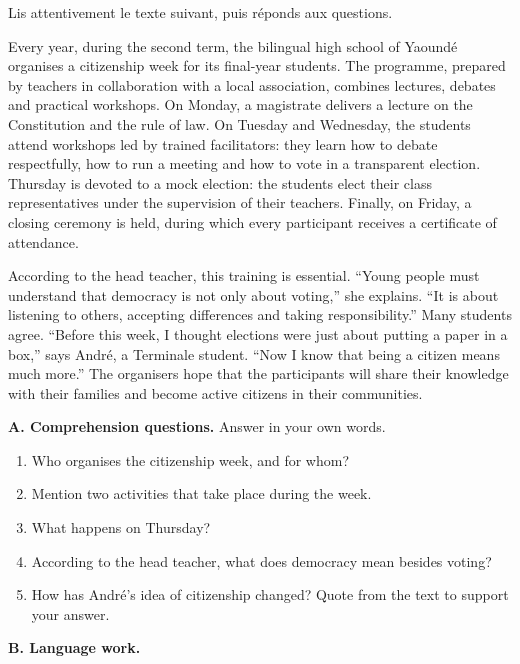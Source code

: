 \documentclass[11pt]{article}
\begin{document}
\begin{exercice}
Lis attentivement le texte suivant, puis réponds aux questions.

\begin{textebox}
Every year, during the second term, the bilingual high school of Yaoundé organises a citizenship week for its final-year students. The programme, prepared by teachers in collaboration with a local association, combines lectures, debates and practical workshops. On Monday, a magistrate delivers a lecture on the Constitution and the rule of law. On Tuesday and Wednesday, the students attend workshops led by trained facilitators: they learn how to debate respectfully, how to run a meeting and how to vote in a transparent election. Thursday is devoted to a mock election: the students elect their class representatives under the supervision of their teachers. Finally, on Friday, a closing ceremony is held, during which every participant receives a certificate of attendance.

According to the head teacher, this training is essential. “Young people must understand that democracy is not only about voting,” she explains. “It is about listening to others, accepting differences and taking responsibility.” Many students agree. “Before this week, I thought elections were just about putting a paper in a box,” says André, a Terminale student. “Now I know that being a citizen means much more.” The organisers hope that the participants will share their knowledge with their families and become active citizens in their communities.
\end{textebox}

\textbf{A. Comprehension questions.} Answer in your own words.

\begin{enumerate}
\item Who organises the citizenship week, and for whom?
\item Mention two activities that take place during the week.
\item What happens on Thursday?
\item According to the head teacher, what does democracy mean besides voting?
\item How has André's idea of citizenship changed? Quote from the text to support your answer.
\end{enumerate}

\textbf{B. Language work.}


\end{exercice}
\end{document}
